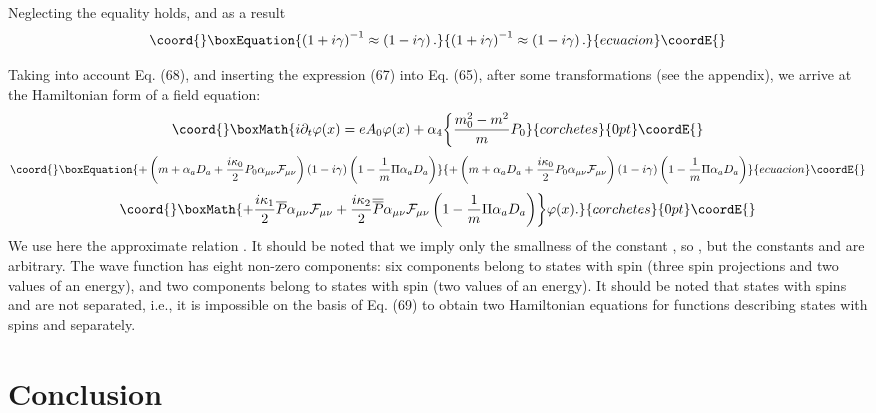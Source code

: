 \documentclass[a4paper,12pt]{article}
\begin{document}
Neglecting \coordHE{} the equality \coordHE{} holds,
and as a result
\begin{equation}\coord{}\boxEquation{
\left( 1+i\gamma \right) ^{-1}\approx\left( 1-i\gamma \right).
\label{68}
}{
\left( 1+i\gamma \right) ^{-1}\approx\left( 1-i\gamma \right).
}{ecuacion}\coordE{}\end{equation}

Taking into account Eq. (68), and inserting the expression (67)
into Eq. (65), after some transformations (see the appendix), we
arrive at the Hamiltonian form of a field equation:
\[\coord{}\boxMath{
i\partial_t\varphi(x)=eA_0\varphi(x)+\alpha_4\biggl\{\frac{m_0^2-m^2}
{m}P_0
}{corchetes}{0pt}\coordE{}\]
\begin{equation}\coord{}\boxEquation{
+\left(m+\alpha _aD_a+\frac{i\kappa_0}{2} P_0\alpha_{\mu \nu
}\mathcal{F}_{\mu \nu }\right)\left( 1-i\gamma \right)\left(1
-\frac{1}{m}\Pi \alpha_aD_a\right)
}{
+\left(m+\alpha _aD_a+\frac{i\kappa_0}{2} P_0\alpha_{\mu \nu
}\mathcal{F}_{\mu \nu }\right)\left( 1-i\gamma \right)\left(1
-\frac{1}{m}\Pi \alpha_aD_a\right)
}{ecuacion}\coordE{}\end{equation}\label{69}
\[\coord{}\boxMath{
+\frac{i\kappa_1}2 \overline{P}\alpha _{\mu \nu }\mathcal{F}_{\mu
\nu }+\frac{i\kappa_2}{2}\overline{\overline{P}}\alpha _{\mu \nu
}\mathcal{F}_{\mu \nu }\left( 1-\frac 1m\Pi \alpha _aD_a\right)
\biggr \}\varphi (x).
}{corchetes}{0pt}\coordE{}\]
We use here the approximate relation \coordHE{}. It
should be noted that we imply only the smallness of the constant
\coordHE{}, so \coordHE{}, but the constants \coordHE{}
and \coordHE{} are arbitrary. The wave function \coordHE{} has
eight non-zero components: six components belong to states with
spin \coordHE{} (three spin projections and two values of an energy), and
two components belong to states with spin \coordHE{} (two values of an
energy). It should be noted that states with spins \coordHE{} and \coordHE{} are
not separated, i.e., it is impossible on the basis of Eq. (69) to
obtain two Hamiltonian equations for functions describing states
with spins \coordHE{} and \coordHE{} separately.

\section{Conclusion}
\end{document}
